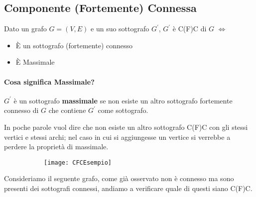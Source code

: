%
%
%
%
%
%
%
%
%






\subsection{Componente (Fortemente) Connessa}

Dato un grafo $G=(V,E)$ e un suo sottografo $G^{\prime}$, $G^{\prime}$  è C(F)C di $G$ $\iff$ 
\begin{itemize}
	\item È un sottografo (fortemente) connesso
	\item È Massimale
\end{itemize}



\paragraph{Cosa significa Massimale?}
$G^{\prime}$ è un sottografo \textbf{massimale} se non esiste un altro sottografo fortemente connesso di $G$ che contiene $G^{\prime}$ come sottografo.\bigskip

In poche parole vuol dire che non esiste un altro sottografo C(F)C con gli stessi vertici e stessi archi; nel caso in cui si aggiungesse un vertice si verrebbe a perdere la proprietà di massimale.

\begin{figure}[H]
    \centering
    \begin{subfigure}[b]{0.35\textwidth}
        \texttt{[image: CFCEsempio]} 
    \end{subfigure}
\end{figure}
Consideriamo il seguente grafo, come già osservato non è connesso ma sono presenti dei sottografi connessi, andiamo a verificare quale di questi siano C(F)C.\smallskip

